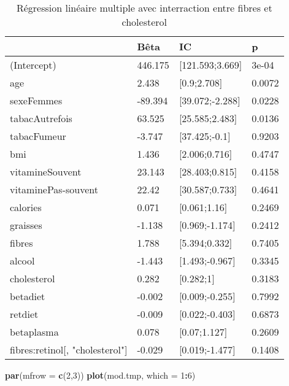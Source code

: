 \documentclass[]{article}
\newenvironment{Shaded}{\begin{snugshade}}{\end{snugshade}}
\newcommand{\KeywordTok}[1]{\textcolor[rgb]{0.13,0.29,0.53}{\textbf{#1}}}
\newcommand{\DataTypeTok}[1]{\textcolor[rgb]{0.13,0.29,0.53}{#1}}
\newcommand{\DecValTok}[1]{\textcolor[rgb]{0.00,0.00,0.81}{#1}}
\newcommand{\OperatorTok}[1]{\textcolor[rgb]{0.81,0.36,0.00}{\textbf{#1}}}
\newcommand{\NormalTok}[1]{#1}
\begin{document}
\begin{table}

\caption{\label{tab:unnamed-chunk-76}Régression linéaire multiple avec interraction entre fibres et cholesterol}
\centering
\begin{tabular}[t]{l|l|l|l}
\hline
  & Bêta & IC & p\\
\hline
\rowcolor[HTML]{BBD2E1}  (Intercept) & 446.175 & [121.593;3.669] & 3e-04\\
\hline
age & 2.438 & [0.9;2.708] & 0.0072\\
\hline
\rowcolor[HTML]{BBD2E1}  sexeFemmes & -89.394 & [39.072;-2.288] & 0.0228\\
\hline
tabacAutrefois & 63.525 & [25.585;2.483] & 0.0136\\
\hline
\rowcolor[HTML]{BBD2E1}  tabacFumeur & -3.747 & [37.425;-0.1] & 0.9203\\
\hline
bmi & 1.436 & [2.006;0.716] & 0.4747\\
\hline
\rowcolor[HTML]{BBD2E1}  vitamineSouvent & 23.143 & [28.403;0.815] & 0.4158\\
\hline
vitaminePas-souvent & 22.42 & [30.587;0.733] & 0.4641\\
\hline
\rowcolor[HTML]{BBD2E1}  calories & 0.071 & [0.061;1.16] & 0.2469\\
\hline
graisses & -1.138 & [0.969;-1.174] & 0.2412\\
\hline
\rowcolor[HTML]{BBD2E1}  fibres & 1.788 & [5.394;0.332] & 0.7405\\
\hline
alcool & -1.443 & [1.493;-0.967] & 0.3345\\
\hline
\rowcolor[HTML]{BBD2E1}  cholesterol & 0.282 & [0.282;1] & 0.3183\\
\hline
betadiet & -0.002 & [0.009;-0.255] & 0.7992\\
\hline
\rowcolor[HTML]{BBD2E1}  retdiet & -0.009 & [0.022;-0.403] & 0.6873\\
\hline
betaplasma & 0.078 & [0.07;1.127] & 0.2609\\
\hline
\rowcolor[HTML]{BBD2E1}  fibres:retinol[, "cholesterol"] & -0.029 & [0.019;-1.477] & 0.1408\\
\hline
\end{tabular}
\end{table}

\begin{Shaded}
\begin{Highlighting}[]
\KeywordTok{par}\NormalTok{(}\DataTypeTok{mfrow =} \KeywordTok{c}\NormalTok{(}\DecValTok{2}\NormalTok{,}\DecValTok{3}\NormalTok{))}
\KeywordTok{plot}\NormalTok{(mod.tmp, }\DataTypeTok{which =} \DecValTok{1}\OperatorTok{:}\DecValTok{6}\NormalTok{)}
\end{Highlighting}
\end{Shaded}
\end{document}
